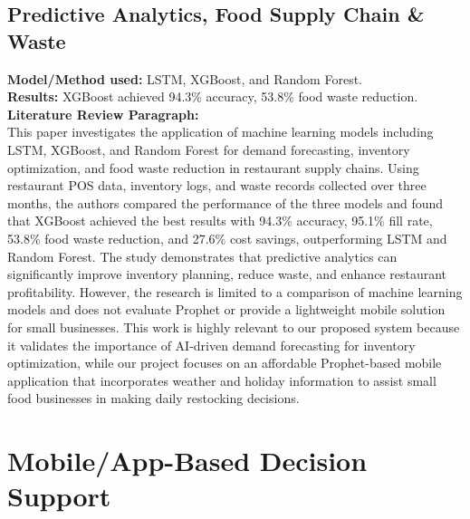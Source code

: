 \documentclass[conference]{IEEEtran}
\begin{document}
\subsection{Predictive Analytics, Food Supply Chain \& Waste}
\textbf{Model/Method used:} LSTM, XGBoost, and Random Forest.\\
\textbf{Results:} XGBoost achieved 94.3\% accuracy, 53.8\% food waste reduction.\\
\textbf{Literature Review Paragraph:}\\
This paper investigates the application of machine learning models including LSTM, XGBoost, and Random Forest for demand forecasting, inventory optimization, and food waste reduction in restaurant supply chains. Using restaurant POS data, inventory logs, and waste records collected over three months, the authors compared the performance of the three models and found that XGBoost achieved the best results with 94.3\% accuracy, 95.1\% fill rate, 53.8\% food waste reduction, and 27.6\% cost savings, outperforming LSTM and Random Forest. The study demonstrates that predictive analytics can significantly improve inventory planning, reduce waste, and enhance restaurant profitability. However, the research is limited to a comparison of machine learning models and does not evaluate Prophet or provide a lightweight mobile solution for small businesses. This work is highly relevant to our proposed system because it validates the importance of AI-driven demand forecasting for inventory optimization, while our project focuses on an affordable Prophet-based mobile application that incorporates weather and holiday information to assist small food businesses in making daily restocking decisions.


\section{Mobile/App-Based Decision Support}
\end{document}

